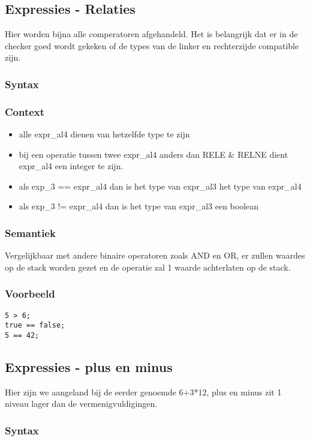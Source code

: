 \documentclass[]{article}
\begin{document}
\subsection{Expressies - Relaties}
Hier worden bijna alle comperatoren afgehandeld. Het is belangrijk dat er in de checker goed wordt gekeken of de types van de linker en rechterzijde compatible zijn.
\subsubsection{Syntax}

\subsubsection{Context}
\begin{itemize}
\item alle expr\_al4 dienen van hetzelfde type te zijn
\item bij een operatie tussen twee expr\_al4 anders dan RELE \& RELNE dient expr\_al4 een integer te zijn.
\item als exp\_3 == expr\_al4 dan is het type van expr\_al3 het type van expr\_al4
\item als exp\_3 != expr\_al4 dan is het type van expr\_al3 een boolean
\end{itemize}
\subsubsection{Semantiek}
Vergelijkbaar met andere binaire operatoren zoals AND en OR, er zullen waardes op de stack worden gezet en de operatie zal 1 waarde achterlaten op de stack.
\subsubsection{Voorbeeld}
\begin{lstlisting}[style=SELMA]
5 > 6;
true == false;
5 == 42;
\end{lstlisting}

\subsection{Expressies - plus en minus}
Hier zijn we aangeland bij de eerder genoemde 6+3*12, plus en minus zit 1 niveau lager dan de vermenigvuldigingen.
\subsubsection{Syntax}

\end{document}
